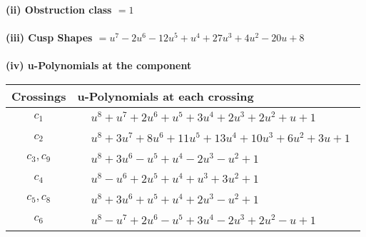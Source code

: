 \documentclass[1p]{elsarticle_modified}
\theoremstyle{definition}
\begin{document}
\flushleft \textbf{(ii) Obstruction class $= 1$}\\~\\
\flushleft \textbf{(iii) Cusp Shapes $= u^7-2 u^6-12 u^5+u^4+27 u^3+4 u^2-20 u+8$}\\~\\
\newpage\renewcommand{\arraystretch}{1}
\flushleft \textbf{(iv) u-Polynomials at the component}\newline \\
\begin{tabular}{m{50pt}|m{274pt}}
Crossings & \hspace{64pt}u-Polynomials at each crossing \\
\hline $$\begin{aligned}c_{1}\end{aligned}$$&$\begin{aligned}
&u^8+u^7+2 u^6+u^5+3 u^4+2 u^3+2 u^2+u+1
\end{aligned}$\\
\hline $$\begin{aligned}c_{2}\end{aligned}$$&$\begin{aligned}
&u^8+3 u^7+8 u^6+11 u^5+13 u^4+10 u^3+6 u^2+3 u+1
\end{aligned}$\\
\hline $$\begin{aligned}c_{3},c_{9}\end{aligned}$$&$\begin{aligned}
&u^8+3 u^6- u^5+u^4-2 u^3- u^2+1
\end{aligned}$\\
\hline $$\begin{aligned}c_{4}\end{aligned}$$&$\begin{aligned}
&u^8- u^6+2 u^5+u^4+u^3+3 u^2+1
\end{aligned}$\\
\hline $$\begin{aligned}c_{5},c_{8}\end{aligned}$$&$\begin{aligned}
&u^8+3 u^6+u^5+u^4+2 u^3- u^2+1
\end{aligned}$\\
\hline $$\begin{aligned}c_{6}\end{aligned}$$&$\begin{aligned}
&u^8- u^7+2 u^6- u^5+3 u^4-2 u^3+2 u^2- u+1
\end{aligned}$\\

\end{tabular}
\end{document}
